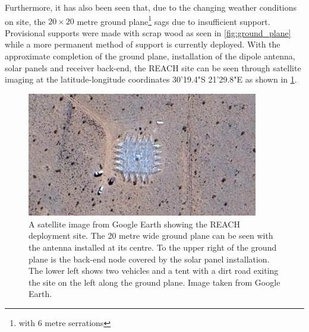 Furthermore, it has also been seen that, due to the changing weather conditions on site, the $20 \times 20$ metre ground plane\footnote{with 6 metre serrations} sags due to insufficient support. Provisional supports were made with scrap wood as seen in \cref{fig:ground_plane} while a more permanent method of support is currently deployed. With the approximate completion of the ground plane, installation of the dipole antenna, solar panels and receiver back-end, the REACH site can be seen through satellite imaging at the latitude-longitude coordinates 30'19.4"S 21'29.8"E as shown in \cref{fig:sat_image}.
\begin{figure}
    \centering
    \includegraphics[width=0.9\textwidth]{sat_image}
    \caption{A satellite image from Google Earth showing the REACH deployment site. The 20 metre wide ground plane can be seen with the antenna installed at its centre. To the upper right of the ground plane is the back-end node covered by the solar panel installation. The lower left shows two vehicles and a tent with a dirt road exiting the site on the left along the ground plane. Image taken from Google Earth.}
    \label{fig:sat_image}
\end{figure}
